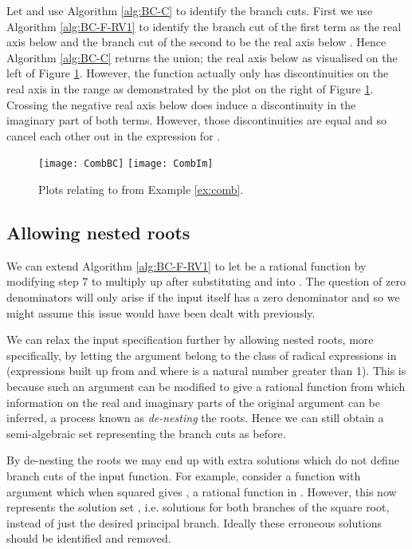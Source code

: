 \documentclass{llncs}
\begin{document}
\begin{example} \label{ex:comb}
Let  and use Algorithm \ref{alg:BC-C} to identify the branch cuts.  First we use Algorithm \ref{alg:BC-F-RV1} to identify the branch cut of the first term as the real axis below  and the branch cut of the second to be the real axis below .  Hence Algorithm \ref{alg:BC-C} returns the union; the real axis below  as visualised on the left of Figure \ref{fig:comb}.  However, the function actually only has discontinuities on the real axis in the range  as demonstrated by the plot on the right of Figure \ref{fig:comb}.  Crossing the negative real axis below  does induce a discontinuity in the imaginary part of both terms.  However, those discontinuities are equal and so cancel each other out in the expression for .
\end{example}

\begin{figure}[ht]
\begin{center}
\texttt{[image: CombBC]}
\hspace*{0.3cm}
\texttt{[image: CombIm]}
\end{center}
\caption{Plots relating to  from Example \ref{ex:comb}.} 
\label{fig:comb}
\end{figure}



\subsection{Allowing nested roots}

We can extend Algorithm \ref{alg:BC-F-RV1} to let  be a rational function by modifying step 7 to multiply up after substituting  and  into .  The question of zero denominators will only arise if the input  itself has a zero denominator and so we might assume this issue would have been dealt with previously.

We can relax the input specification further by allowing nested roots, more specifically, by letting the argument belong to the class of radical expressions in  (expressions built up from  and  where  is a natural number greater than 1).  This is because such an argument can be modified to give a rational function from which information on the real and imaginary parts of the original argument can be inferred, a process known as \textit{de-nesting} the roots.  Hence we can still obtain a semi-algebraic set representing the branch cuts as before.  

By de-nesting the roots we may end up with extra solutions which do not define branch cuts of the input function.  For example, consider a function with argument  which when squared gives , a rational function in .  However, this now represents the solution set , i.e. solutions for both branches of the square root, instead of just the desired principal branch.  Ideally these erroneous solutions should be identified and removed.
\end{document}
